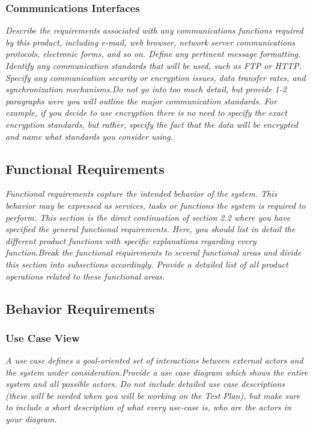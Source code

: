        \subsubsection{Communications Interfaces}
            \emph{Describe the requirements associated with any communications functions required by this product, including e-mail, web browser, network server communications protocols, electronic forms, and so on. Define any pertinent message formatting. Identify any communication standards that will be used, such as FTP or HTTP. Specify any communication security or encryption issues, data transfer rates, and synchronization mechanisms.\gnl Do not go into too much detail, but provide 1-2 paragraphs were you will outline the major communication standards. For example, if you decide to use encryption there is no need to specify the exact encryption standards, but rather, specify the fact that the data will be encrypted and name what standards you consider using.}
    \subsection{Functional Requirements}
        \emph{Functional requirements capture the intended behavior of the system. This behavior may be expressed as services, tasks or functions the system is required to perform. This section is the direct continuation of section 2.2 where you have specified the general functional requirements. Here, you should list in detail the different product functions with specific explanations regarding every function.\gnl Break the functional requirements to several functional areas and divide this section into subsections accordingly. Provide a detailed list of all product operations related to these functional areas.}
    \subsection{Behavior Requirements}
        \subsubsection{Use Case View}
            \emph{A use case defines a goal-oriented set of interactions between external actors and the system under consideration.\gnl Provide a use case diagram which shows the entire system and all possible actors. Do not include detailed use case descriptions (these will be needed when you will be working on the Test Plan), but make sure to include a short description of what every use-case is, who are the actors in your diagram.}
